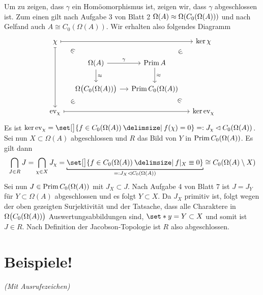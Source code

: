 \begin{beweis}
	Um zu zeigen, dass $\gamma$ ein Homöomorphismus ist, zeigen wir, dass $\gamma$ abgeschlossen ist.
	Zum einen gilt nach Aufgabe 3 von Blatt 2 $\Omega(A) \approx \Omega \enbrace*{C_0(\Omega(A))}$ und nach Gelfand auch $A \cong C_0(\Omega(A))$.
	Wir erhalten also folgendes Diagramm
	\[
		\begin{tikzcd}[column sep=small]
			\chi \ar[ddd,mapsto] \ar[rrr,mapsto] \drar[phantom,sloped, description,"\in"] & & & \ker \chi \dlar[phantom,sloped, description,"\in"]\\[-1ex]
			&\Omega(A) \rar["\gamma"] \dar["\approx"] &[7cm] \Prim A \dar["\approx"] \\
			&\Omega\enbrace[\big]{C_0(\Omega(A))} \rar & \Prim C_0(\Omega(A)) \\[-1ex]
			\ev_\chi \ar[rrr,mapsto] \urar[phantom,sloped, description,"\in"] & & & \ker \ev_\chi \ular[phantom,sloped, description,"\in"]
		\end{tikzcd}
	\]
	Es ist $\ker \ev_\chi = \set[\big]{f \in C_0(\Omega(A)) \given f(\chi)=0} =: J_\chi \lhd C_0(\Omega(A))$. 
	Sei nun $X \subset \Omega(A)$ abgeschlossen und $R$ das Bild von $Y$ in $\Prim C_0(\Omega(A))$.
	Es gilt dann
	\[
		\bigcap_{J \in R} J = \bigcap_{\chi \in X} J_\chi = \Underbracket{\set[\big]{f \in C_0(\Omega(A)) \given f|_X \equiv 0}}{=: J_X \lhd C_0(\Omega(A))} \cong C_0 \enbrace*{\Omega(A) \setminus X}
	\]
	Sei nun $J \in \Prim C_0(\Omega(A))$ mit $J_X \subset J$.
	Nach Aufgabe 4 von Blatt 7 ist $J=J_Y$ für $Y \subset \Omega(A)$ abgeschlossen und es folgt $Y \subset X$. 
	Da $J_X$ primitiv ist, folgt wegen der oben gezeigten Surjektivität und der Tatsache, dass alle Charaktere in $\Omega\enbrace[\big]{C_0(\Omega(A))}$ Auswertungsabbildungen sind, $\set*{y}=Y \subset X$ und somit ist $J \in R$. 
	Nach Definition der Jacobson-Topologie ist $R$ also abgeschlossen.
\end{beweis}
\newpage

\section{Beispiele!} %
\label{sec:beispiele}
\emph{(Mit Ausrufezeichen)}

